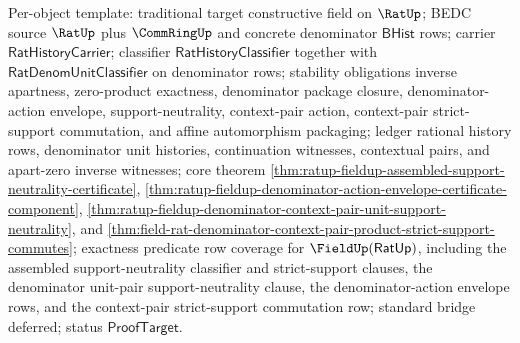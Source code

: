 Per-object template: traditional target constructive field on $\RatUp$; BEDC
source $\RatUp$ plus $\CommRingUp$ and concrete denominator $\mathsf{BHist}$
rows; carrier $\mathsf{RatHistoryCarrier}$; classifier
$\mathsf{RatHistoryClassifier}$ together with
$\mathsf{RatDenomUnitClassifier}$ on denominator rows; stability obligations
inverse apartness, zero-product exactness, denominator package closure,
denominator-action envelope, support-neutrality, context-pair action,
context-pair strict-support commutation, and affine automorphism packaging;
ledger rational history rows, denominator unit histories, continuation
witnesses, contextual pairs, and apart-zero inverse witnesses; core theorem
\autoref{thm:ratup-fieldup-assembled-support-neutrality-certificate},
\autoref{thm:ratup-fieldup-denominator-action-envelope-certificate-component},
\autoref{thm:ratup-fieldup-denominator-context-pair-unit-support-neutrality},
and
\autoref{thm:field-rat-denominator-context-pair-product-strict-support-commutes};
exactness predicate row coverage for $\FieldUp(\mathsf{RatUp})$, including the
assembled support-neutrality classifier and strict-support clauses, the
denominator unit-pair support-neutrality clause, the denominator-action envelope
rows, and the context-pair strict-support commutation row; standard bridge
deferred; status $\mathsf{ProofTarget}$.

